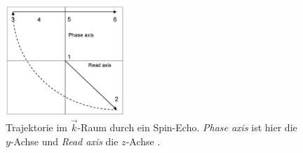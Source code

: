\documentclass[../main.tex]{subfiles}
\begin{document}
\begin{itemize}
        \begin{figure}[H]
            \centering
            \includegraphics[width=0.4\textwidth]{Bilddateien/GrundlagenMehrdimMRISpinecho.jpg}
            \caption{Trajektorie im $\vec{k}$-Raum durch ein Spin-Echo. \textit{Phase axis} ist hier die $y$-Achse und \textit{Read axis} die $z$-Achse \cite[p.74]{doc:EFNMRStudentManual}.}
            \label{fig:GrundlagenMehrdimMRISpinecho}
        \end{figure}
    \end{itemize}
\end{document}
